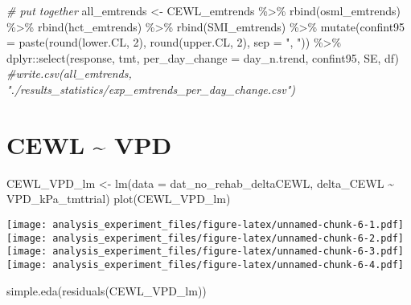 \documentclass[
]{article}
\newenvironment{Shaded}{\begin{snugshade}}{\end{snugshade}}
\newcommand{\AttributeTok}[1]{\textcolor[rgb]{0.77,0.63,0.00}{#1}}
\newcommand{\CommentTok}[1]{\textcolor[rgb]{0.56,0.35,0.01}{\textit{#1}}}
\newcommand{\DecValTok}[1]{\textcolor[rgb]{0.00,0.00,0.81}{#1}}
\newcommand{\FunctionTok}[1]{\textcolor[rgb]{0.00,0.00,0.00}{#1}}
\newcommand{\NormalTok}[1]{#1}
\newcommand{\OtherTok}[1]{\textcolor[rgb]{0.56,0.35,0.01}{#1}}
\newcommand{\SpecialCharTok}[1]{\textcolor[rgb]{0.00,0.00,0.00}{#1}}
\newcommand{\StringTok}[1]{\textcolor[rgb]{0.31,0.60,0.02}{#1}}
\begin{document}
\begin{Shaded}
\begin{Highlighting}[]
\CommentTok{\# put together}
\NormalTok{all\_emtrends }\OtherTok{\textless{}{-}}\NormalTok{ CEWL\_emtrends }\SpecialCharTok{\%\textgreater{}\%}
  \FunctionTok{rbind}\NormalTok{(osml\_emtrends) }\SpecialCharTok{\%\textgreater{}\%}
  \FunctionTok{rbind}\NormalTok{(hct\_emtrends) }\SpecialCharTok{\%\textgreater{}\%}
  \FunctionTok{rbind}\NormalTok{(SMI\_emtrends) }\SpecialCharTok{\%\textgreater{}\%}
  \FunctionTok{mutate}\NormalTok{(}\AttributeTok{confint95 =} \FunctionTok{paste}\NormalTok{(}\FunctionTok{round}\NormalTok{(lower.CL, }\DecValTok{2}\NormalTok{), }\FunctionTok{round}\NormalTok{(upper.CL, }\DecValTok{2}\NormalTok{), }\AttributeTok{sep =} \StringTok{", "}\NormalTok{)) }\SpecialCharTok{\%\textgreater{}\%}
\NormalTok{  dplyr}\SpecialCharTok{::}\FunctionTok{select}\NormalTok{(response, tmt, }
                \AttributeTok{per\_day\_change =}\NormalTok{ day\_n.trend,}
\NormalTok{                confint95,}
\NormalTok{                SE, df)}
\CommentTok{\#write.csv(all\_emtrends, "./results\_statistics/exp\_emtrends\_per\_day\_change.csv")}
\end{Highlighting}
\end{Shaded}

\hypertarget{cewl-vpd}{%
\section{CEWL \textasciitilde{} VPD}\label{cewl-vpd}}

\begin{Shaded}
\begin{Highlighting}[]
\NormalTok{CEWL\_VPD\_lm }\OtherTok{\textless{}{-}} \FunctionTok{lm}\NormalTok{(}\AttributeTok{data =}\NormalTok{ dat\_no\_rehab\_deltaCEWL,}
\NormalTok{                               delta\_CEWL }\SpecialCharTok{\textasciitilde{}}\NormalTok{ VPD\_kPa\_tmttrial)}
\FunctionTok{plot}\NormalTok{(CEWL\_VPD\_lm)}
\end{Highlighting}
\end{Shaded}

\texttt{[image: analysis\_experiment\_files/figure-latex/unnamed-chunk-6-1.pdf]}
\texttt{[image: analysis\_experiment\_files/figure-latex/unnamed-chunk-6-2.pdf]}
\texttt{[image: analysis\_experiment\_files/figure-latex/unnamed-chunk-6-3.pdf]}
\texttt{[image: analysis\_experiment\_files/figure-latex/unnamed-chunk-6-4.pdf]}

\begin{Shaded}
\begin{Highlighting}[]
\FunctionTok{simple.eda}\NormalTok{(}\FunctionTok{residuals}\NormalTok{(CEWL\_VPD\_lm))}
\end{Highlighting}
\end{Shaded}
\end{document}
